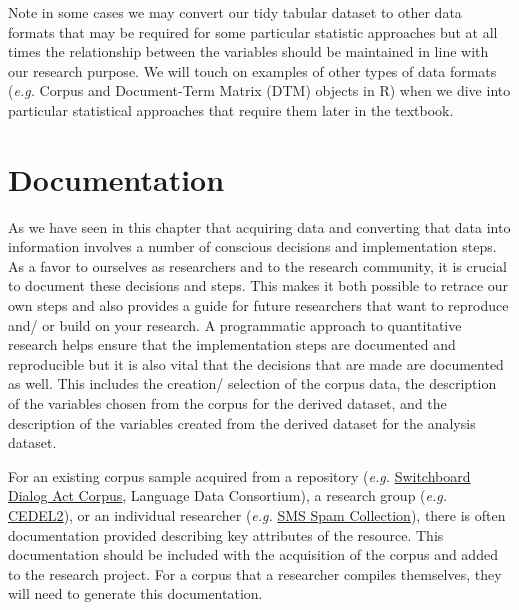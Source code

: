 \documentclass[
  letterpaper,
]{latex/krantz}
\begin{document}
\begin{tcolorbox}[enhanced jigsaw, toprule=.15mm, bottomtitle=1mm, coltitle=black, title=\textcolor{quarto-callout-warning-color}{\faExclamationTriangle}\hspace{0.5em}{Tip}, left=2mm, colframe=quarto-callout-warning-color-frame, bottomrule=.15mm, colbacktitle=quarto-callout-warning-color!10!white, leftrule=.75mm, colback=white, titlerule=0mm, breakable, toptitle=1mm, opacityback=0, arc=.35mm, rightrule=.15mm, opacitybacktitle=0.6]

Note in some cases we may convert our tidy tabular dataset to other data
formats that may be required for some particular statistic approaches
but at all times the relationship between the variables should be
maintained in line with our research purpose. We will touch on examples
of other types of data formats (\emph{e.g.} Corpus and Document-Term
Matrix (DTM) objects in R) when we dive into particular statistical
approaches that require them later in the textbook.

\end{tcolorbox}

\hypertarget{documentation}{%
\section{Documentation}\label{documentation}}

As we have seen in this chapter that acquiring data and converting that
data into information involves a number of conscious decisions and
implementation steps. As a favor to ourselves as researchers and to the
research community, it is crucial to document these decisions and steps.
This makes it both possible to retrace our own steps and also provides a
guide for future researchers that want to reproduce and/ or build on
your research. A programmatic approach to quantitative research helps
ensure that the implementation steps are documented and reproducible but
it is also vital that the decisions that are made are documented as
well. This includes the creation/ selection of the corpus data, the
description of the variables chosen from the corpus for the derived
dataset, and the description of the variables created from the derived
dataset for the analysis dataset.

For an existing corpus sample acquired from a repository (\emph{e.g.}
\href{https://catalog.ldc.upenn.edu/LDC97S62}{Switchboard Dialog Act
Corpus}, Language Data Consortium), a research group (\emph{e.g.}
\href{http://cedel2.learnercorpora.com/}{CEDEL2}), or an individual
researcher (\emph{e.g.}
\href{https://www.dt.fee.unicamp.br/~tiago/smsspamcollection/}{SMS Spam
Collection}), there is often documentation provided describing key
attributes of the resource. This documentation should be included with
the acquisition of the corpus and added to the research project. For a
corpus that a researcher compiles themselves, they will need to generate
this documentation.
\end{document}
